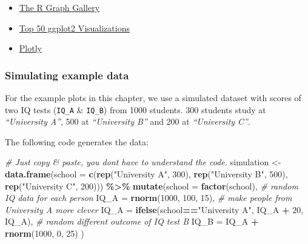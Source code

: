 \documentclass[
]{scrartcl}
\newenvironment{Shaded}{\begin{snugshade}}{\end{snugshade}}
\newcommand{\CommentTok}[1]{\textcolor[rgb]{0.56,0.35,0.01}{\textit{#1}}}
\newcommand{\DataTypeTok}[1]{\textcolor[rgb]{0.13,0.29,0.53}{#1}}
\newcommand{\DecValTok}[1]{\textcolor[rgb]{0.00,0.00,0.81}{#1}}
\newcommand{\KeywordTok}[1]{\textcolor[rgb]{0.13,0.29,0.53}{\textbf{#1}}}
\newcommand{\NormalTok}[1]{#1}
\newcommand{\OperatorTok}[1]{\textcolor[rgb]{0.81,0.36,0.00}{\textbf{#1}}}
\newcommand{\StringTok}[1]{\textcolor[rgb]{0.31,0.60,0.02}{#1}}
\providecommand{\tightlist}{%
  \setlength{\itemsep}{0pt}\setlength{\parskip}{0pt}}
\begin{document}
\begin{itemize}
\tightlist
\item
  \href{http://www.r-graph-gallery.com/}{The R Graph Gallery}
\item
  \href{http://r-statistics.co/Top50-Ggplot2-Visualizations-MasterList-R-Code.html}{Top 50 ggplot2 Visualizations}
\item
  \href{https://plotly.com/ggplot2/}{Plotly}
\end{itemize}

\hypertarget{simulating-example-data}{%
\subsubsection*{Simulating example data}\label{simulating-example-data}}

For the example plots in this chapter, we use a simulated dataset with scores of two IQ tests (\texttt{IQ\_A} \& \texttt{IQ\_B}) from 1000 students. 300 students study at \emph{``University A''}, 500 at \emph{``University B''} and 200 at \emph{``University C''}.

The following code generates the data:

\begin{Shaded}
\begin{Highlighting}[]
\CommentTok{\# Just copy \& paste, you don\textquotesingle{}t have to understand the code.}
\NormalTok{simulation \textless{}{-}}\StringTok{ }\KeywordTok{data.frame}\NormalTok{(}\DataTypeTok{school =} \KeywordTok{c}\NormalTok{(}\KeywordTok{rep}\NormalTok{(}\StringTok{"University A"}\NormalTok{, }\DecValTok{300}\NormalTok{),}
                              \KeywordTok{rep}\NormalTok{(}\StringTok{"University B"}\NormalTok{, }\DecValTok{500}\NormalTok{),}
                              \KeywordTok{rep}\NormalTok{(}\StringTok{"University C"}\NormalTok{, }\DecValTok{200}\NormalTok{))) }\OperatorTok{\%\textgreater{}\%}
\StringTok{        }\KeywordTok{mutate}\NormalTok{(}\DataTypeTok{school =} \KeywordTok{factor}\NormalTok{(school),}
             \CommentTok{\# random IQ data for each person}
             \DataTypeTok{IQ\_A =} \KeywordTok{rnorm}\NormalTok{(}\DecValTok{1000}\NormalTok{, }\DecValTok{100}\NormalTok{, }\DecValTok{15}\NormalTok{),}
             \CommentTok{\# make people from University A more clever}
             \DataTypeTok{IQ\_A =} \KeywordTok{ifelse}\NormalTok{(school}\OperatorTok{==}\StringTok{"University A"}\NormalTok{, IQ\_A }\OperatorTok{+}\StringTok{ }\DecValTok{20}\NormalTok{, IQ\_A),}
             \CommentTok{\# random different outcome of IQ test B}
             \DataTypeTok{IQ\_B =}\NormalTok{ IQ\_A }\OperatorTok{+}\StringTok{ }\KeywordTok{rnorm}\NormalTok{(}\DecValTok{1000}\NormalTok{, }\DecValTok{0}\NormalTok{, }\DecValTok{25}\NormalTok{) )}
\end{Highlighting}
\end{Shaded}
\end{document}
